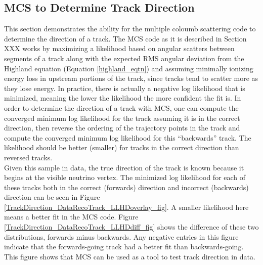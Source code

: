 \subsection{MCS to Determine Track Direction}\label{TrackDirection_DataRecoTrack_section}
This section demonstrates the ability for the multiple coloumb scattering code to determine the direction of a track. The MCS code as it is described in Section XXX works by maximizing a likelihood based on angular scatters between segments of a track along with the expected RMS angular deviation from the Highland equation (Equation \ref{highland_eqtn}) and assuming minimally ionizing energy loss in upstream portions of the track, since tracks tend to scatter more as they lose energy. In practice, there is actually a negative log likelihood that is minimized, meaning the lower the likelihood the more confident the fit is. In order to determine the direction of a track with MCS, one can compute the converged minimum log likelihood for the track assuming it is in the correct direction, then reverse the ordering of the trajectory points in the track and compute the converged minimum log likelihood for this ``backwards'' track. The likelihood should be better (smaller) for tracks in the correct direction than reversed tracks.\\

Given this sample in {\ub} data, the true direction of the track is known because it begins at the visible neutrino vertex. The minimized log likelihood for each of these tracks both in the correct (forwards) direction and incorrect (backwards) direction can be seen in Figure \ref{TrackDirection_DataRecoTrack_LLHDoverlay_fig}. A smaller likelihood here means a better fit in the MCS code. Figure \ref{TrackDirection_DataRecoTrack_LLHDdiff_fig} shows the difference of these two distributions, forwards minus backwards. Any negative entries in this figure indicate that the forwards-going track had a better fit than backwards-going. This figure shows that MCS can be used as a tool to test track direction in {\ub} data.

